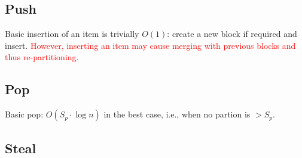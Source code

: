 \documentclass[a4paper,12pt]{article}
\newcommand\todo[1]{\textcolor{red}{#1}}
\renewcommand\O[1]{O\left(#1\right)}
\begin{document}
\subsection{Push}\label{sec:complexity:push}
Basic insertion of an item is trivially $\O{1}$: create a new block if required and insert. 
\todo{However, inserting an item may cause merging with previous blocks and thus re-partitioning.}

\subsection{Pop}\label{sec:complexity:pop}
Basic pop: $\O{S_p \cdot \log n}$ in the best case, i.e., when no partion is $>S_p$.

\subsection{Steal}\label{sec:complexity:steal}
\end{document}
